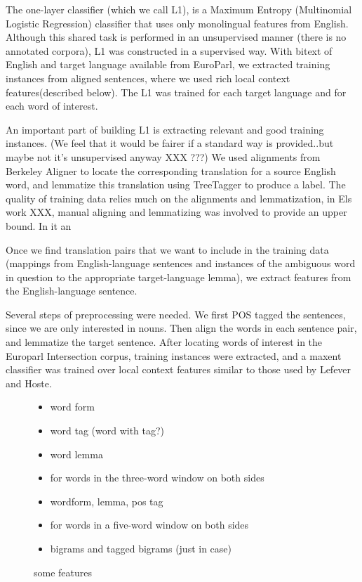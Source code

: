 \documentclass[11pt,letterpaper]{article}
\begin{document}
The one-layer classifier (which we call L1), is a Maximum Entropy (Multinomial Logistic Regression) classifier that uses only monolingual features from English.
Although this shared task is performed in an unsupervised manner (there is no annotated corpora), L1 was constructed in a supervised way.
With bitext of English and target language available from EuroParl, we extracted training instances from aligned sentences, where we used rich local context features(described below).
The L1 was trained for each target language and for each word of interest. 

An important part of building L1 is extracting relevant and good training instances. 
(We feel that it would be fairer if a standard way is provided..but maybe not it's unsupervised anyway XXX ???)
We used alignments from Berkeley Aligner to locate the corresponding translation for a source English word,
and lemmatize this translation using TreeTagger to produce a label.  
The quality of training data relies much on the alignments and lemmatization, in Els work XXX, manual aligning and lemmatizing was involved to provide an upper bound.
In it an  


Once we find translation pairs that we want to include in the training data
(mappings from English-language sentences and instances of the ambiguous word
in question to the appropriate target-language lemma), we extract features from
the English-language sentence. 

Several steps of preprocessing were needed. We first POS tagged the sentences, since we are only interested in nouns.
Then align the words in each sentence pair, and lemmatize the target sentence.
After locating words of interest in the
Europarl Intersection corpus, training instances were extracted, and a maxent
classifier was trained over local context features similar to those used by Lefever and
Hoste.

\begin{figure}
  \begin{itemize}
  \item word form
  \item word tag (word with tag?)
  \item word lemma
  \item for words in the three-word window on both sides
  \item wordform, lemma, pos tag
  \item for words in a five-word window on both sides
  \item bigrams and tagged bigrams (just in case)
  \end{itemize}
  \label{features}
  \caption{some features}
\end{figure}
\end{document}

